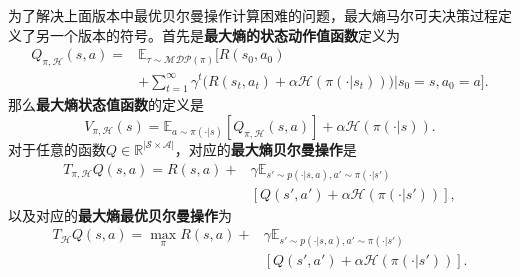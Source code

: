 为了解决上面版本中最优贝尔曼操作计算困难的问题，最大熵马尔可夫决策过程\cite{haarnoja2017reinforcement,schulman2017equivalence}定义了另一个版本的符号。首先是\textbf{最大熵的状态动作值函数}定义为
\begin{equation}
    \begin{aligned}
    Q_{\pi,\mathcal{H}}(s, a) =& \mathbb{E}_{\tau \sim \mathcal{MDP}(\pi)} \bigg[R(s_0, a_0) \\
    &+ \sum^{\infty}_{t=1} \gamma^t \bigg(R(s_t, a_t) + \alpha \mathcal{H}(\pi(\cdot \vert s_t))\bigg) \bigg\vert s_0 = s, a_0 = a\bigg].
    \end{aligned}
\end{equation}
那么\textbf{最大熵状态值函数}的定义是
\begin{equation}
    V_{\pi,\mathcal{H}}(s) = \mathbb{E}_{a \sim \pi(\cdot \vert s)} [Q_{\pi,\mathcal{H}}(s, a)] + \alpha \mathcal{H}(\pi(\cdot \vert s)).
\end{equation}
对于任意的函数$Q \in \mathbb{R}^{\vert \mathcal{S} \times \mathcal{A} \vert}$，对应的\textbf{最大熵贝尔曼操作}是
\begin{equation}
    \begin{aligned}
    T_{\pi,\mathcal{H}}Q (s, a) = R(s, a)
    + & \gamma \mathbb{E}_{s' \sim p(\cdot \vert s, a), a' \sim \pi(\cdot \vert s')} \\
    &[Q(s', a') + \alpha \mathcal{H}(\pi(\cdot \vert s'))],
    \end{aligned}
\end{equation}
以及对应的\textbf{最大熵最优贝尔曼操作}为
\begin{equation}
    \begin{aligned}
    T_{\mathcal{H}}Q (s, a) = \max_{\pi} R(s, a) + & \gamma \mathbb{E}_{s' \sim p(\cdot \vert s, a), a' \sim \pi(\cdot \vert s')} \\
    & [Q(s', a') + \alpha \mathcal{H}(\pi(\cdot \vert s')) ].
    \end{aligned}
\end{equation}

